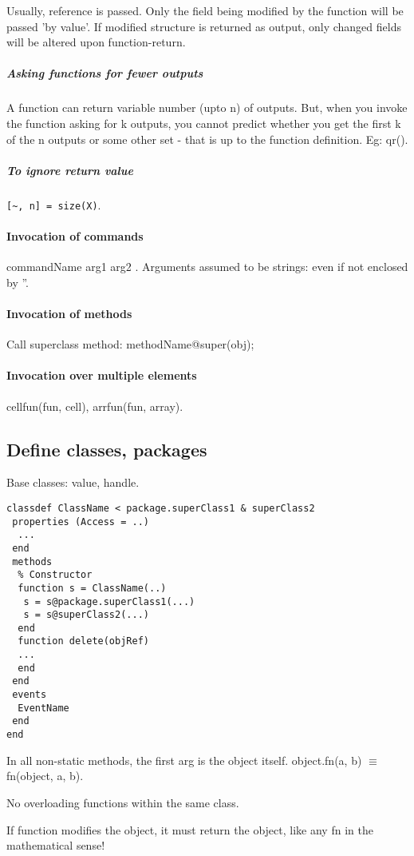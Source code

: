 \documentclass[oneside, article]{memoir}
\begin{document}
Usually, reference is passed. Only the field being modified by the function will be passed 'by value'. If modified structure is returned as output, only changed fields will be altered upon function-return.

\subparagraph*{Asking functions for fewer outputs}
A function can return variable number (upto n) of outputs. But, when you invoke the function asking for k outputs, you cannot predict whether you get the first k of the n outputs or some other set - that is up to the function definition. Eg: qr().

\subparagraph*{To ignore return value}
\verb'[~, n] = size(X)'.


\paragraph*{Invocation of commands}
commandName arg1 arg2 . Arguments assumed to be strings: even if not enclosed by ''.

\paragraph*{Invocation of methods}
Call superclass method: methodName@super(obj);

\paragraph*{Invocation over multiple elements}
cellfun(fun, cell), arrfun(fun, array).

\subsection{Define classes, packages}
Base classes: value, handle.

\begin{verbatim}
classdef ClassName < package.superClass1 & superClass2
 properties (Access = ..)
  ...
 end
 methods
  % Constructor
  function s = ClassName(..)
   s = s@package.superClass1(...)
   s = s@superClass2(...)
  end
  function delete(objRef)
  ...
  end
 end
 events
  EventName
 end
end
\end{verbatim}

In all non-static methods, the first arg is the object itself. object.fn(a, b) $\equiv$ fn(object, a, b).

No overloading functions within the same class.

If function modifies the object, it must return the object, like any fn in the mathematical sense!
\end{document}
